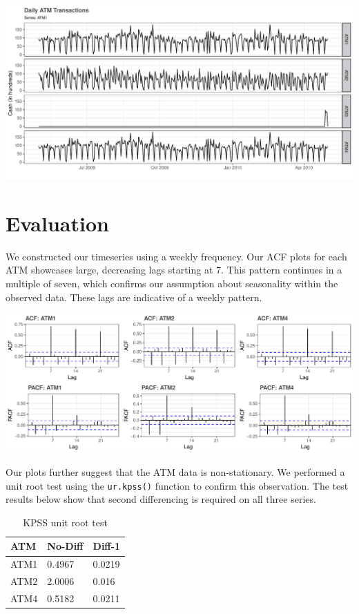\documentclass[openany]{book}
\begin{document}
\includegraphics{Part-A-JM_files/figure-latex/unnamed-chunk-3-1.pdf}

\hypertarget{evaluation}{%
\section{Evaluation}\label{evaluation}}

We constructed our timeseries using a weekly frequency. Our ACF plots
for each ATM showcases large, decreasing lags starting at 7. This
pattern continues in a multiple of seven, which confirms our assumption
about seasonality within the observed data. These lags are indicative of
a weekly pattern.

\includegraphics{Part-A-JM_files/figure-latex/unnamed-chunk-4-1.pdf}

Our plots further suggest that the ATM data is non-stationary. We
performed a unit root test using the \texttt{ur.kpss()} function to
confirm this observation. The test results below show that second
differencing is required on all three series.

\begin{table}[H]

\caption{\label{tab:unnamed-chunk-5}KPSS unit root test}
\centering
\begin{tabular}{l|l|l}
\hline
\textbf{ATM} & \textbf{No-Diff} & \textbf{Diff-1}\\
\hline
\rowcolor{gray!6}  ATM1 & 0.4967 & 0.0219\\
\hline
ATM2 & 2.0006 & 0.016\\
\hline
\rowcolor{gray!6}  ATM4 & 0.5182 & 0.0211\\
\hline
\end{tabular}
\end{table}
\end{document}
